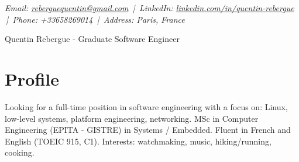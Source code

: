 \documentclass[9pt,a4paper]{article}
\newcommand{\namefont}{\fontsize{18}{22}\selectfont}
\newcommand{\tinyscript}{\fontsize{8}{8}\selectfont}
\begin{document}
\renewcommand\normalsize{\fontsize{10.5}{15}\selectfont}
\normalsize

\begin{center}
  {\tinyscript\itshape
  Email: \href{mailto:reberguequentin@gmail.com}{reberguequentin@gmail.com} \,|\,
  LinkedIn: \href{https://linkedin.com/in/quentin-rebergue}{linkedin.com/in/quentin-rebergue} \,|\,
  Phone: +33658269014 \,|\,
  Address: Paris, France}
\end{center}

\begin{center}
  {\namefont Quentin Rebergue - Graduate Software Engineer}
\end{center}

\section*{Profile}
\begin{tcolorbox}[mybox2]
Looking for a full-time position in software engineering with a focus on: Linux, low-level systems, platform engineering, networking. MSc in Computer Engineering (EPITA - GISTRE) in Systems / Embedded. Fluent in French and English (TOEIC 915, C1). Interests: watchmaking, music, hiking/running, cooking.
\end{tcolorbox}
\end{document}
